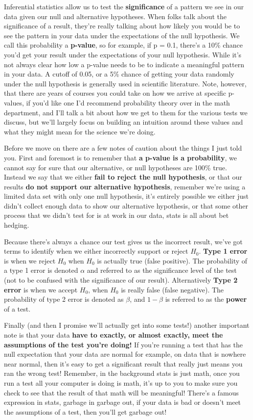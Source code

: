 \documentclass[
]{article}
\begin{document}
Inferential statistics allow us to test the \textbf{significance} of a
pattern we see in our data given our null and alternative hypotheses.
When folks talk about the significance of a result, they're really
talking about how likely you would be to see the pattern in your data
under the expectations of the null hypothesis. We call this probability
a \textbf{p-value}, so for example, if p = 0.1, there's a 10\% chance
you'd get your result under the expectations of your null hypothesis.
While it's not always clear how low a p-value needs to be to indicate a
meaningful pattern in your data. A cutoff of 0.05, or a 5\% chance of
getting your data randomly under the null hypothesis is generally used
in scientific literature. Note, however, that there are years of courses
you could take on how we arrive at specific p-values, if you'd like one
I'd recommend probability theory over in the math department, and I'll
talk a bit about how we get to them for the various tests we discuss,
but we'll largely focus on building an intuition around these values and
what they might mean for the science we're doing.

Before we move on there are a few notes of caution about the things I
just told you. First and foremost is to remember that \textbf{a p-value
is a probability}, we cannot say for sure that our alternative, or null
hypotheses are 100\% true. Instead we say that we either \textbf{fail to
reject the null hypothesis}, or that our results \textbf{do not support
our alternative hypothesis}, remember we're using a limited data set
with only one null hypothesis, it's entirely possible we either just
didn't collect enough data to show our alternative hypothesis, or that
some other process that we didn't test for is at work in our data, stats
is all about bet hedging.

Because there's always a chance our test gives us the incorrect result,
we've got terms to identify when we either incorrectly support or reject
\(H_0\). \textbf{Type 1 error} is when we reject \(H_0\) when \(H_0\) is
actually true (false positive). The probability of a type 1 error is
denoted \(\alpha\) and referred to as the significance level of the test
(not to be confused with the significance of our result). Alternatively
\textbf{Type 2 error} is when we accept \(H_0\), when \(H_0\) is really
false (false negative). The probability of type 2 error is denoted as
\(\beta\), and \(1-\beta\) is referred to as the \textbf{power} of a
test.

Finally (and then I promise we'll actually get into some tests!) another
important note is that your data \textbf{have to exactly, or almost
exactly, meet the assumptions of the test you're doing!} If you're
running a test that has the null expectation that your data are normal
for example, on data that is nowhere near normal, then it's easy to get
a significant result that really just means you ran the wrong test!
Remember, in the background stats is just math, once you run a test all
your computer is doing is math, it's up to you to make sure you check to
see that the result of that math will be meaningful! There's a famous
expression in stats, garbage in garbage out, if your data is bad or
doesn't meet the assumptions of a test, then you'll get garbage out!
\end{document}
